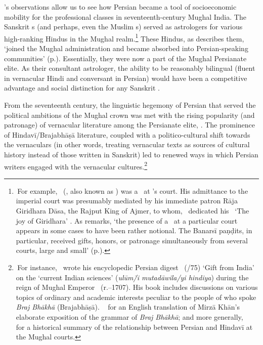 \citeauthor{AlamPersian1998}'s observations allow us to see how Persian became a tool of socioeconomic mobility for the professional classes in seventeenth-century Mughal India. The Sanskrit \jyotisa s (and perhaps, even the Muslim \munajjim s) served as astrologers for various high-ranking Hindus in the Mughal realm.\footnote{\,For example, \VedangarayaMalajit\ (, also known as \Srimalaji) was a \jyotisa\ at \Shahjahan's court. His admittance to the imperial court was presumably mediated by his immediate patron Rāja Giridhara Dāsa, the Rajput King of Ajmer, to whom, \Srimalaji\ dedicated his \Giridharananda\ `The joy of Giridhara' \parencite[121--122]{Minkowskilearnedbrahmin}. As \citeauthor{Minkowskilearnedbrahmin} remarks, `the presence of a \jyotisa\ at a particular court appears in some cases to have been rather notional. The Banarsī paṇḍits, in particular, received gifts, honors, or patronage simultaneously from several courts, large and small' (p.).\label{srimalaji_footnote}} These Hindus, as \textcite{Truschke} describes them, `joined the Mughal administration and became absorbed into Persian-speaking communities' (p.). Essentially, they were now a part of the Mughal Persianate elite. As their consultant astrologer, the ability to be reasonably bilingual (fluent in vernacular Hindi and conversant in Persian) would have been a competitive advantage and social distinction for any Sanskrit \jyotisa.

From the seventeenth century, the linguistic hegemony of Persian that served the political ambitions of the Mughal crown was met with the rising popularity (and patronage) of vernacular literature among the Persianate elite, \parencite[\eg \vid][chapters~3--4]{AllisonHindiPoetry}. The prominence of Hindavī/Brajabhāṣā literature, coupled with a politico-cultural shift towards the vernaculars (in other words, treating vernacular texts as sources of cultural history instead of those written in Sanskrit) led to renewed ways in which Persian writers engaged with the vernacular cultures.\footnote{\,For instance, \MirzaKhanbFakhralDinMuhammad\ wrote his encyclopedic Persian digest \TuhfatalHind\ (/75) `Gift from India' on the `current Indian sciences' (\Ayn \textit{ulūm\=/i mutadāwila\-/yi hindiya}) during the reign of Mughal Emperor \Awrangzeb\ (r.--1707). His book includes discussions on various topics of ordinary and academic interests peculiar to the people of who spoke \textit{Braj Bhākhā} (Brajabhāṣā). \Vid\ \textcite{Ziauddin} for an English translation of Mirzā Khān's elaborate exposition of the grammar of \textit{Braj Bhākhā}; and more generally, \vid\ \textcite[342--348]{AlamPersian1998} for a historical summary of the relationship between Persian and Hindavī at the Mughal courts.} 

